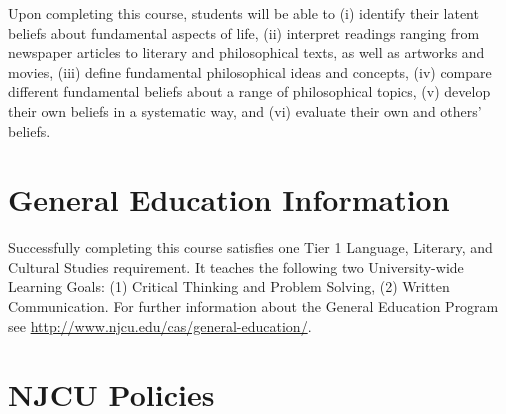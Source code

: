 \documentclass[article,oneside]{memoir}
\begin{document}
Upon completing this course, students will be able to (i) identify their latent beliefs about fundamental aspects of life, (ii) interpret readings ranging from newspaper articles to literary and philosophical texts, as well as artworks and movies, (iii) define fundamental philosophical ideas and concepts, (iv) compare different fundamental beliefs about a range of philosophical topics, (v) develop their own beliefs in a systematic way, and (vi) evaluate their own and others’ beliefs.

\section{General Education Information} 
Successfully completing this course satisfies one Tier 1 Language, Literary, and Cultural Studies requirement. It teaches the following two University-wide Learning Goals: (1) Critical Thinking and Problem Solving, (2) Written Communication. For further information about the General Education Program see \href{http://www.njcu.edu/cas/general-education/}{http://www.njcu.edu/cas/general-education/}.









\section{NJCU Policies}
\end{document}
